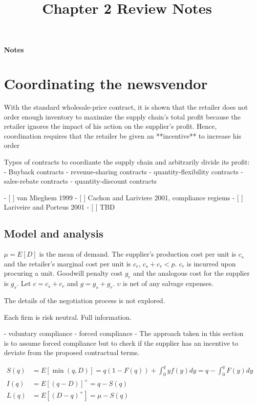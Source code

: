 \setcounter{section}{1}
\title{Chapter 2 Review Notes}

\thispagestyle{empty}

\begin{center}
{\LARGE \bf Notes}\\
\end{center}

\section{Coordinating the newsvendor}

With the standard wholesale-price contract, it is shown that the retailer does not order enough inventory to maximize the supply chain’s total profit because the retailer ignores the impact of his action on the supplier’s profit. Hence, coordination requires that the retailer be given an **incentive** to increase his order

Types of contracts to coordiante the supply chain and arbitrarily divide its profit:
- Buyback contracts
- revenue-sharing contracts
- quantity-flexibility contracts 
- sales-rebate contracts
- quantity-discount contracts

- [ ] van Mieghem 1999
- [ ] Cachon and Lariviere 2001, compliance regiems
- [ ] Lariveire and Porteus 2001
- [ ] TBD

\subsection{Model and analysis}
$\mu=E[D]$ is the mean of demand. The supplier's production cost per unit is $c_s$ and the retailer's marginal cost per unit is $c_r$, $c_s+c_r<p$. $c_r$ is incurred upon procuring a unit. Goodwill penalty cost $g_r$ and the analogous cost for the supplier is $g_s$. Let $c=c_s+c_r$ and $g=g_s+g_r$. $\upsilon$ is net of any salvage expenses. 

The details of the negotiation process is not explored.

Each firm is risk neutral. Full information.

- voluntary compliance
- forced compliance
- The approach taken in this section is to assume forced compliance but to check if the supplier has an incentive to deviate from the proposed contractual terms.


\begin{align*}
    S(q)&=E[\min(q,D)]=q(1-F(q))+\int_0^q y f(y)dy=q-\int_0^q F(y)dy\\
    I(q)&=E[(q-D)]^+=q-S(q)\\
    L(q)&=E[(D-q)^+]=\mu-S(q)
\end{align*}

